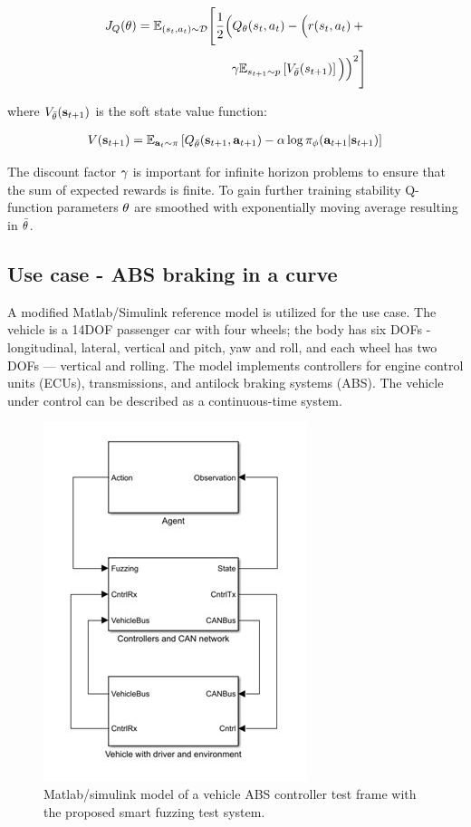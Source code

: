 \documentclass[a4paper, fleqn]{template/cas-dc}
\begin{document}
	\begin{align}				
		J_Q(\theta) = \mathbb{E}_{(s_t,a_t)\sim\mathcal{D}} \Bigg[ \frac{1}{2} \Big( Q_\theta(s_t, a_t) - \Big( r(s_t,a_t) + {} \notag \\
		\gamma \mathbb{E}_{s_{t+1}\sim p} \left[ V_{\bar{\theta}}(s_{t+1}) \right] \Big) \Big)^2 \Bigg]							
		\label{eq:q_cost}		
	\end{align}
	
	where $V_{\bar{\theta}}({\mathbf{s}_{t+1}})$ is the soft state value function:
	
	\begin{align}
		V({\mathbf{s}_{t+1}}) = \operatorname{\mathbb{E}}_{{\mathbf{a}_t}\sim\pi}\left[Q_{\bar{\theta}}({\mathbf{s}_{t+1}}, {\mathbf{a}_{t+1}}) - \alpha\log\pi_{\phi}({\mathbf{a}_{t+1}}|{\mathbf{s}_{t+1}})\right]
	\end{align}
	
	The discount factor $\gamma$ is important for infinite horizon problems to ensure that the sum of expected rewards is finite. To gain further training stability Q-function parameters $\theta$ are smoothed with exponentially moving average resulting in $\bar{\theta}$.
		
	\subsection{Use case - ABS braking in a curve}
	
	A modified Matlab/Simulink reference model is utilized for the use case. The vehicle is a 14DOF passenger car with four wheels; the body has six DOFs - longitudinal, lateral, vertical and pitch, yaw and roll, and each wheel has two DOFs — vertical and rolling. The model implements controllers for engine control units (ECUs), transmissions, and antilock braking systems (ABS). The vehicle under control can be described as a continuous-time system. 
	
	\begin{figure}[h]
		\centering
		\includegraphics[width=.6\columnwidth]{figures/actualmodel.jpg}
		\caption{Matlab/simulink model of a vehicle ABS controller test frame with the proposed smart fuzzing test system.}
		\label{FIG:ABS_Simulink}
	\end{figure}
	
\end{document}
